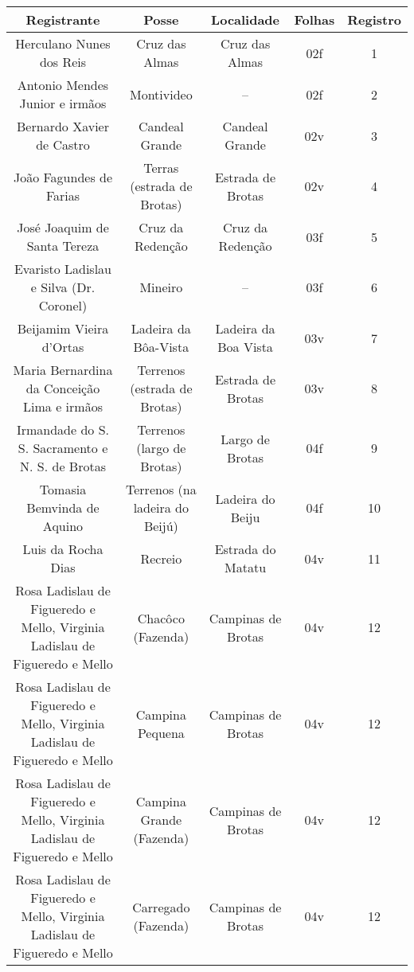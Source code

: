 \begin{table}[!htp]
{
\begin{tiny}
\begin{tabular}{ccccc}
\toprule
\textbf{Registrante}								&\textbf{Posse}				&\textbf{Localidade}			&\textbf{Folhas}	&\textbf{Registro}	&\\
\midrule
\midrule
Herculano Nunes dos Reis							&Cruz das Almas				&Cruz das Almas				&02f			&1			&\\
Antonio Mendes Junior e irmãos							&Montivideo				&--					&02f			&2			&\\
Bernardo Xavier de Castro							&Candeal Grande				&Candeal Grande				&02v			&3			&\\
João Fagundes de Farias								&Terras (estrada de Brotas)		&Estrada de Brotas			&02v			&4			&\\
José Joaquim de Santa Tereza							&Cruz da Redenção			&Cruz da Redenção			&03f			&5			&\\
Evaristo Ladislau e Silva (Dr. Coronel)						&Mineiro				&--					&03f			&6			&\\
Beijamim Vieira d'Ortas								&Ladeira da Bôa-Vista			&Ladeira da Boa Vista			&03v			&7			&\\
Maria Bernardina da Conceição Lima e irmãos					&Terrenos (estrada de Brotas)		&Estrada de Brotas			&03v			&8			&\\
Irmandade do S. S. Sacramento e N. S. de Brotas					&Terrenos (largo de Brotas)		&Largo de Brotas			&04f			&9			&\\
Tomasia Bemvinda de Aquino							&Terrenos (na ladeira do Beijú)		&Ladeira do Beiju			&04f			&10			&\\
Luis da Rocha Dias 								&Recreio				&Estrada do Matatu			&04v			&11			&\\
Rosa Ladislau de Figueredo e Mello, Virginia Ladislau de Figueredo e Mello	&Chacôco (Fazenda)			&Campinas de Brotas			&04v			&12			&\\
Rosa Ladislau de Figueredo e Mello, Virginia Ladislau de Figueredo e Mello	&Campina Pequena			&Campinas de Brotas			&04v			&12			&\\
Rosa Ladislau de Figueredo e Mello, Virginia Ladislau de Figueredo e Mello	&Campina Grande (Fazenda)		&Campinas de Brotas			&04v			&12			&\\
Rosa Ladislau de Figueredo e Mello, Virginia Ladislau de Figueredo e Mello	&Carregado (Fazenda)			&Campinas de Brotas			&04v			&12			&\\

\end{tabular}
\end{tiny}}
\end{table}
